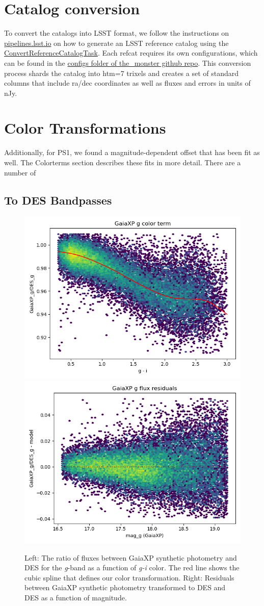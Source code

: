 \section{Catalog conversion}
\label{sec:conversion}
To convert the catalogs into LSST format, we follow the instructions on \href{https://pipelines.lsst.io/modules/lsst.meas.algorithms/creating-a-reference-catalog.html}{pipelines.lsst.io} on how to generate an LSST reference catalog using the \href{https://pipelines.lsst.io/modules/lsst.meas.algorithms/tasks/lsst.meas.algorithms.ConvertReferenceCatalogTask.html#lsst-task-lsst-meas-algorithms-convertreferencecatalog-convertreferencecatalogtask}{ConvertReferenceCatalogTask}. Each refcat requires its own configurations, which can be found in the \href{https://github.com/lsst-dm/the_monster/tree/main/configs}{configs folder of the\_monster github repo}.
This conversion process shards the catalog into htm=7 trixels and creates a set of standard columns that include ra/dec coordinates as well as fluxes and errors in units of nJy.

\section{Color Transformations}
\label{sec:colors}
Additionally, for PS1, we found a magnitude-dependent offset that has been fit as well. The Colorterms section describes these fits in more detail.
There are a number of
\subsection{To DES Bandpasses}
\begin{figure}
    \includegraphics[width=0.49\linewidth]{./figures/color_terms/GaiaXP_to_DES_band_g_color_term.png}
    \includegraphics[width=0.49\linewidth]{./figures/color_terms/GaiaXP_to_DES_band_g_flux_residuals.png}
    \caption{Left: The ratio of fluxes between GaiaXP synthetic photometry and DES for the \textit{g}-band as a function of \textit{g-i} color. The red line shows the cubic spline that defines our color transformation.
    Right: Residuals between GaiaXP synthetic photometry transformed to DES and DES as a function of magnitude.}
\end{figure}

